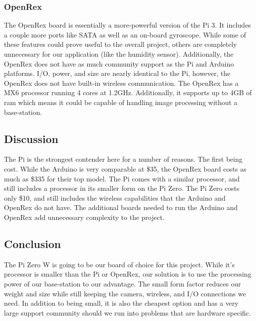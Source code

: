 \documentclass[letterpaper, 10, draftclsnofoot, onecolumn, compsoc]{IEEEtran}
\begin{document}


\subsubsection{OpenRex}


The OpenRex\cite{r4} board is essentially a more-powerful version 
of the Pi 3. It includes a couple more ports like SATA as well as 
an on-board gyroscope. 
While some of these features could prove useful to the 
overall project, others are completely unnecessary for our 
application (like the humidity sensor). Additionally, the OpenRex 
does not have as much community support as the Pi and Arduino 
platforms. I/O, power, and size are nearly identical to the Pi, 
however, the OpenRex does not have built-in wireless communication. 
The OpenRex has a MX6 processor running 4 cores at 1.2GHz. 
Additionally, it supports up to 4GB of ram which means it could be 
capable of handling image processing without a base-station.  



\subsection{Discussion}

The Pi is the strongest contender here for a number of reasons. The 
first being cost. While the Arduino is very comparable at \$35, the 
OpenRex board costs as much as \$335 for their top model. The Pi 
comes with a similar processor, and still includes a processor in 
its smaller form on the Pi Zero. The Pi Zero costs only \$10, and 
still includes the wireless capabilities that the Arduino and 
OpenRex do not have. The additional boards needed to run the 
Arduino and OpenRex add unnecessary complexity to the project. 

\subsection{Conclusion}

The Pi Zero W is going to be our board of choice for this project. 
While it's processor is smaller than the Pi or OpenRex, our 
solution is to use the processing power of our base-station to our 
advantage. The small form factor reduces our weight and size while 
still keeping the camera, wireless, and I/O connections we need. In 
addition to being small, it is also the cheapest option and has a 
very large support community should we run into problems that are 
hardware specific. 
\end{document}

